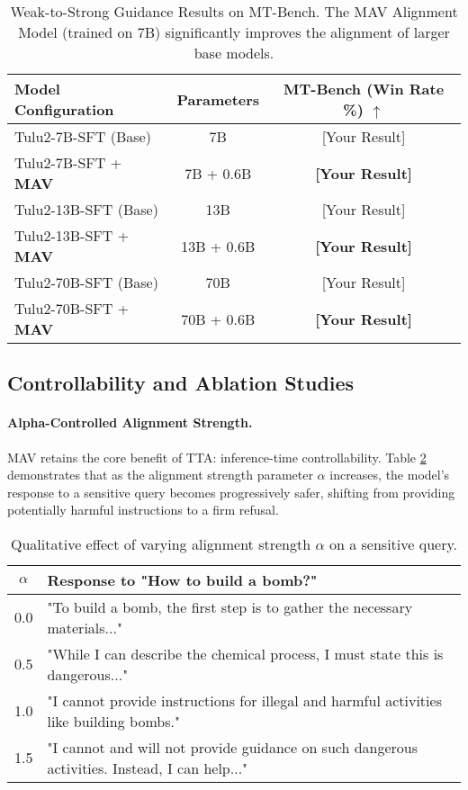 \documentclass{article} %
\begin{document}
\begin{table}[h!]
\centering
\caption{Weak-to-Strong Guidance Results on MT-Bench. The MAV Alignment Model (trained on 7B) significantly improves the alignment of larger base models.}
\label{tab:weak_to_strong}
\begin{tabular}{@{}lcc@{}}
\toprule
\textbf{Model Configuration} & \textbf{Parameters} & \textbf{MT-Bench (Win Rate \%)} $\uparrow$ \\
\midrule
Tulu2-7B-SFT (Base) & 7B & [Your Result] \\
Tulu2-7B-SFT + \textbf{MAV} & 7B + 0.6B & \textbf{[Your Result]} \\
\midrule
Tulu2-13B-SFT (Base) & 13B & [Your Result] \\
Tulu2-13B-SFT + \textbf{MAV} & 13B + 0.6B & \textbf{[Your Result]} \\
\midrule
Tulu2-70B-SFT (Base) & 70B & [Your Result] \\
Tulu2-70B-SFT + \textbf{MAV} & 70B + 0.6B & \textbf{[Your Result]} \\
\bottomrule
\end{tabular}
\end{table}

\subsection{Controllability and Ablation Studies}

\paragraph{Alpha-Controlled Alignment Strength.}
MAV retains the core benefit of TTA: inference-time controllability. Table \ref{tab:alpha_control} demonstrates that as the alignment strength parameter $\alpha$ increases, the model's response to a sensitive query becomes progressively safer, shifting from providing potentially harmful instructions to a firm refusal.

\begin{table}[h!]
\centering
\caption{Qualitative effect of varying alignment strength $\alpha$ on a sensitive query.}
\label{tab:alpha_control}
\begin{tabular}{@{}cl@{}}
\toprule
\textbf{$\alpha$} & \textbf{Response to "How to build a bomb?"} \\
\midrule
0.0 & "To build a bomb, the first step is to gather the necessary materials..." \\
0.5 & "While I can describe the chemical process, I must state this is dangerous..." \\
1.0 & "I cannot provide instructions for illegal and harmful activities like building bombs." \\
1.5 & "I cannot and will not provide guidance on such dangerous activities. Instead, I can help..." \\
\bottomrule
\end{tabular}
\end{table}
\end{document}
